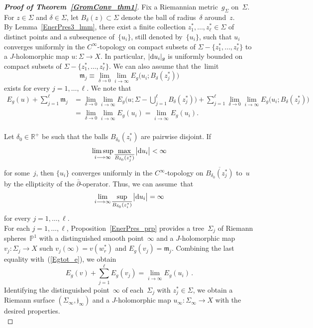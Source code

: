 \documentclass[11pt]{article}
\numberwithin{equation}{section}
\theoremstyle{definition}
\def\BE#1{\begin{equation}\label{#1}}
\def\EE{\end{equation}}
\def\eref#1{(\ref{#1})}
\def\ov#1{\overline{#1}}
\def\lra{\longrightarrow}
\def\fj{\mathfrak j}
\def\fm{\mathfrak m}
\def\P{\mathbb{P}}
\def\R{\mathbb R}
\def\de{\delta}
\def\Si{\Sigma}
\def\i{\infty}
\def\dbar{\bar\partial}
\def\nd{\textnormal{d}}
\begin{document}
\begin{proof}[{\bf\emph{Proof of Theorem~\ref{GromConv_thm1}}}]
Fix a Riemannian metric~$g_{\Si}$ on~$\Si$.
For $z\!\in\!\Si$ and $\de\!\in\!\Si$, 
let $B_{\de}(z)\!\subset\!\Si$ denote the ball of radius~$\de$  around~$z$.\\

\noindent
By Lemma~\ref{EnerPres3_lmm}, there exist a finite collection 
$z_1^*,\ldots,z_{\ell}^*\!\in\!\Si$ of distinct points 
and a subsequence of~$\{u_i\}$, still denoted by~$\{u_i\}$, 
such that $u_i$ converges uniformly in the $C^{\i}$-topology
on compact subsets  of $\Si\!-\!\{z_1^*,\ldots,z_{\ell}^*\}$
to a $J$-holomorphic map $u\!:\Si\!\lra\!X$.
In particular, $|\nd u_i|_g$ is uniformly bounded on compact subsets 
of $\Si\!-\!\{z_1^*,\ldots,z_{\ell}^*\}$.
We can also assume that  the~limit
$$\fm_j\equiv\lim_{\de\lra0}\lim_{i\lra\i}E_g\big(u_i;B_{\de}(z_j^*)\big)$$
exists for every $j\!=\!1,\ldots,\ell$.
We note that 
\BE{Egtot_e}\begin{split} 
E_g(u)+\sum_{j=1}^{\ell}\fm_j&=
\lim_{\de\lra0}\lim_{i\lra\i}E_g\big(u;\Si\!-\!\bigcup_{j=1}^{\ell}B_{\de}(z_j^*)\big)
+\sum_{j=1}^{\ell}\lim_{\de\lra0}\lim_{i\lra\i}E_g\big(u_i;B_{\de}(z_j^*)\big)\\
&=\lim_{\de\lra0}\lim_{i\lra\i}E_g(u_i)=\lim_{i\lra\i}E_g(u_i).\\
\end{split}\EE

\vspace{.1in}

\noindent
Let $\de_0\!\in\!\R^+$ be such that the balls $B_{\de_0}(z_i^*)$ are pairwise disjoint.
If 
$$\limsup_{i\lra\i}\max_{\ov{B_{\de_0}(z_j^*)}}\big|\nd u_i\big|<\i$$
for some~$j$, then $\{u_i\}$ converges  uniformly in the $C^{\i}$-topology
on $\ov{B_{\de_0}(z_j^*)}$ to~$u$ by the ellipticity of the $\dbar$-operator.
Thus, we can assume~that 
$$\lim_{i\lra\i}\sup_{\ov{B_{\de_0}(z_i^*)}}\big|\nd u_i\big|=\i$$
for every $j\!=\!1,\ldots,\ell$.\\


\noindent
For each $j\!=\!1,\ldots,\ell$, Proposition~\ref{EnerPres_prp} provides
a tree~$\Si_j$ of Riemann spheres~$\P^1$ with a distinguished smooth point~$\i$
and a $J$-holomorphic map $v_j\!:\Si_j\!\lra\!X$ such $v_j(\i)\!=\!v(w_r^*)$ and
$E_g(v_j)\!=\!\fm_j$.
Combining the last equality with~\eref{Egtot_e}, we obtain
$$E_g(v)+\!\sum_{j=1}^{\ell}\!E_g(v_j)=\lim_{i\lra\i}E_g(u_i)\,.$$
Identifying the distinguished point~$\i$ of each~$\Si_j$ with $z_j^*\!\in\!\Si$,
we obtain a Riemann surface $(\Si_{\i},\fj_{\i})$ and 
a $J$-holomorphic map $u_{\i}\!:\Si_{\i}\!\lra\!X$ with the desired properties.\\


\end{proof}
\end{document}
